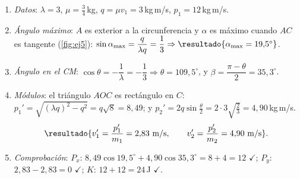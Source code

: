 \documentclass[11pt,a4paper,twoside]{article}
\newcommand{\ok}{\textcolor{verde}{$\checkmark$}}
\begin{document}
\begin{resolucion}
\begin{enumerate}
  \item \emph{Datos}: $\lambda=3$, $\mu=\tfrac34$\,kg, $q=\mu v_{1}=3$\,kg\,m/s, $p_{1}=12$\,kg\,m/s.
  \item \emph{Ángulo máximo}: $A$ es exterior a la circunferencia y $\alpha$ es máximo cuando $AC$ es tangente
        (\cref{fig:ej5}): $\sin\alpha_{\max}=\dfrac{q}{\lambda q}=\dfrac13\Rightarrow\resultado{\alpha_{\max}=19{,}5^{\circ}}$.
  \item \emph{Ángulo en el CM}: $\cos\theta=-\dfrac1\lambda=-\dfrac13\Rightarrow\theta=109{,}5^{\circ}$, y $\beta=\dfrac{\pi-\theta}{2}=35{,}3^{\circ}$.
  \item \emph{Módulos}: el triángulo $AOC$ es rectángulo en $C$:
        $p_{1}'=\sqrt{(\lambda q)^{2}-q^{2}}=q\sqrt8=8{,}49$; y $p_{2}'=2q\sin\frac\theta2=2\cdot3\sqrt{\tfrac23}=4{,}90$\,kg\,m/s.
        \[
          \resultado{v_{1}'=\frac{p_{1}'}{m_{1}}=2{,}83\text{ m/s},\qquad v_{2}'=\frac{p_{2}'}{m_{2}}=4{,}90\text{ m/s}} .
        \]
  \item \emph{Comprobación}: $P_{x}$: $8{,}49\cos19{,}5^{\circ}+4{,}90\cos35{,}3^{\circ}=8+4=12$ \ok{};
        $P_{y}$: $2{,}83-2{,}83=0$ \ok{}; $K$: $12+12=24$\,J \ok{}.
\end{enumerate}
\end{resolucion}
\end{document}
